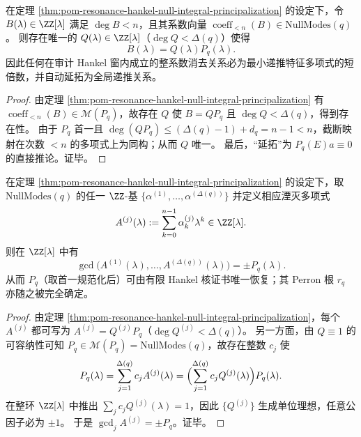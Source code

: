 \begin{corollary}[无截断伪消去与短倍数分解的唯一性]\label{cor:pom-resonance-no-spurious-elimination-unique-short-multiple}
在定理 \ref{thm:pom-resonance-hankel-null-integral-principalization} 的设定下，令
\(
B(\lambda)\in\ZZ[\lambda]
\)
满足 \(\deg B<n\)，且其系数向量 \(\operatorname{coeff}_{<n}(B)\in \mathrm{NullModes}(q)\)。
则存在唯一的 \(Q(\lambda)\in\ZZ[\lambda]\)（\(\deg Q<\Delta(q)\)）使得
\[
\boxed{\;B(\lambda)=Q(\lambda)P_q(\lambda).\;}
\]
因此任何在审计 Hankel 窗内成立的整系数消去关系必为最小递推特征多项式的短倍数，并自动延拓为全局递推关系。
\end{corollary}
\begin{proof}
由定理 \ref{thm:pom-resonance-hankel-null-integral-principalization} 有 \(\operatorname{coeff}_{<n}(B)\in\mathcal{M}(P_q)\)，故存在 \(Q\) 使 \(B=QP_q\) 且 \(\deg Q<\Delta(q)\)，得到存在性。
由于 \(P_q\) 首一且 \(\deg(QP_q)\le (\Delta(q)-1)+d_q=n-1<n\)，截断映射在次数 \(<n\) 的多项式上为同构；从而 \(Q\) 唯一。
最后，“延拓”为 \(P_q(E)a\equiv 0\) 的直接推论。证毕。
\end{proof}

\begin{corollary}\label{cor:pom-resonance-gcd-recovers-minpoly}
在定理 \ref{thm:pom-resonance-hankel-null-integral-principalization} 的设定下，取 \(\mathrm{NullModes}(q)\) 的任一 \(\ZZ\)-基
\(
\{\alpha^{(1)},\dots,\alpha^{(\Delta(q))}\}
\)
并定义相应湮灭多项式
\[
A^{(j)}(\lambda):=\sum_{k=0}^{n-1}\alpha^{(j)}_k\lambda^k\in\ZZ[\lambda].
\]
则在 \(\ZZ[\lambda]\) 中有
\[
\boxed{\;\gcd\bigl(A^{(1)}(\lambda),\dots,A^{(\Delta(q))}(\lambda)\bigr)=\pm P_q(\lambda).\;}
\]
从而 \(P_q\)（取首一规范化后）可由有限 Hankel 核证书唯一恢复；其 Perron 根 \(r_q\) 亦随之被完全确定。
\end{corollary}
\begin{proof}
由定理 \ref{thm:pom-resonance-hankel-null-integral-principalization}，每个 \(A^{(j)}\) 都可写为 \(A^{(j)}=Q^{(j)}P_q\)（\(\deg Q^{(j)}<\Delta(q)\)）。
另一方面，由 \(Q\equiv 1\) 的可容纳性可知 \(P_q\in\mathcal{M}(P_q)=\mathrm{NullModes}(q)\)，故存在整数 \(c_j\) 使
\[
P_q(\lambda)=\sum_{j=1}^{\Delta(q)} c_jA^{(j)}(\lambda)=\Bigl(\sum_{j=1}^{\Delta(q)}c_jQ^{(j)}(\lambda)\Bigr)P_q(\lambda).
\]
在整环 \(\ZZ[\lambda]\) 中推出 \(\sum_j c_jQ^{(j)}(\lambda)=1\)，因此 \(\{Q^{(j)}\}\) 生成单位理想，任意公因子必为 \(\pm1\)。
于是 \(\gcd_j A^{(j)}=\pm P_q\)。证毕。
\end{proof}

